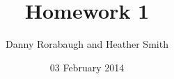 
         \newcommand\alg[1]{\ensuremath{\mathbf{#1}}}
         \newcommand{\<}{\ensuremath{\langle}}
         \renewcommand{\>}{\ensuremath{\rangle}}
         \newcommand\fld[1]{\ensuremath{\mathbb{#1}}}

         \author{Danny Rorabaugh and Heather Smith}
         \title{Homework 1}
         \date{03 February 2014}



\maketitle


